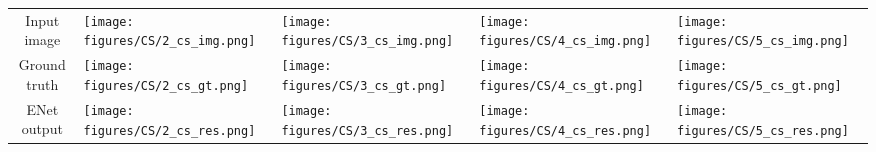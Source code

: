 \documentclass{article}
\begin{document}
\begin{table}[!htb]
  \begin{adjustbox}{width=1.0\textwidth,center}
    \small
    \begin{tabular}{CMMMM}
      Input image
      &\texttt{[image: figures/CS/2\_cs\_img.png]}
      &\texttt{[image: figures/CS/3\_cs\_img.png]}
      &\texttt{[image: figures/CS/4\_cs\_img.png]}
      &\texttt{[image: figures/CS/5\_cs\_img.png]}
      \\
      Ground truth
      &\texttt{[image: figures/CS/2\_cs\_gt.png]}
      &\texttt{[image: figures/CS/3\_cs\_gt.png]}
      &\texttt{[image: figures/CS/4\_cs\_gt.png]}
      &\texttt{[image: figures/CS/5\_cs\_gt.png]}
      \\
      ENet output
      &\texttt{[image: figures/CS/2\_cs\_res.png]}
      &\texttt{[image: figures/CS/3\_cs\_res.png]}
      &\texttt{[image: figures/CS/4\_cs\_res.png]}
      &\texttt{[image: figures/CS/5\_cs\_res.png]}
      \\
    \end{tabular}
  \end{adjustbox}
  \vspace{0.05in}
  \label{fig:cityscapes}


\end{table}
\end{document}

